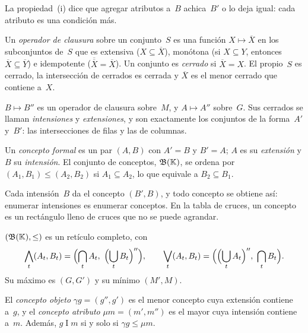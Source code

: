 La propiedad~(i) dice que agregar atributos a~$B$ achica~$B'$ o lo deja igual: cada atributo es una condición más.

\begin{definicion}\label{def:clausura}
Un \emph{operador de clausura} sobre un conjunto~$S$ es una función $X \mapsto \overline{X}$ en los subconjuntos de~$S$ que es extensiva ($X \subseteq \overline{X}$), monótona (si $X \subseteq Y$, entonces $\overline{X} \subseteq \overline{Y}$) e idempotente ($\overline{\overline{X}} = \overline{X}$). Un conjunto es \emph{cerrado} si $\overline{X} = X$. El propio~$S$ es cerrado, la intersección de cerrados es cerrada y $\overline{X}$ es el menor cerrado que contiene a~$X$.
\end{definicion}

\begin{proposicion}\label{prop:clausura}
$B \mapsto B''$ es un operador de clausura sobre~$M$, y $A \mapsto A''$ sobre~$G$. Sus cerrados se llaman \emph{intensiones} y \emph{extensiones}, y son exactamente los conjuntos de la forma~$A'$ y~$B'$: las intersecciones de filas y las de columnas.
\end{proposicion}

\begin{definicion}\label{def:concepto}
Un \emph{concepto formal} es un par $(A, B)$ con $A' = B$ y $B' = A$; $A$ es su \emph{extensión} y $B$ su \emph{intensión}. El conjunto de conceptos, $\mathfrak{B}(\mathbb{K})$, se ordena por $(A_1, B_1) \le (A_2, B_2)$ si $A_1 \subseteq A_2$, lo que equivale a $B_2 \subseteq B_1$.
\end{definicion}

Cada intensión~$B$ da el concepto $(B', B)$, y todo concepto se obtiene así: enumerar intensiones es enumerar conceptos. En la tabla de cruces, un concepto es un rectángulo lleno de cruces que no se puede agrandar.

\begin{teorema}\label{teo:basico}
$(\mathfrak{B}(\mathbb{K}), \le)$ es un retículo completo, con
\[
  \bigwedge_{t} (A_t, B_t) = \Bigl( \bigcap_{t} A_t,\ \Bigl( \bigcup_{t} B_t \Bigr)'' \Bigr),
  \qquad
  \bigvee_{t} (A_t, B_t) = \Bigl( \Bigl( \bigcup_{t} A_t \Bigr)'',\ \bigcap_{t} B_t \Bigr).
\]
Su máximo es $(G, G')$ y su mínimo $(M', M)$.
\end{teorema}

\begin{proposicion}\label{prop:objeto-atributo}
El \emph{concepto objeto} $\gamma g = (g'', g')$ es el menor concepto cuya extensión contiene a~$g$, y el \emph{concepto atributo} $\mu m = (m', m'')$ es el mayor cuya intensión contiene a~$m$. Además, $g \mathrel{I} m$ si y solo si $\gamma g \le \mu m$.
\end{proposicion}

